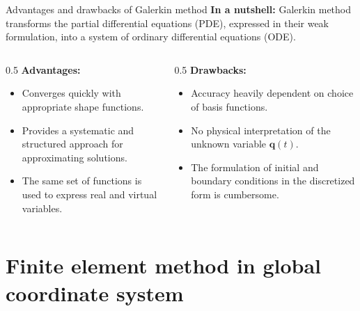 \documentclass[aspectratio=169]{beamer}
\begin{document}
\begin{frame}{Advantages and drawbacks of Galerkin method}
  \textbf{In a nutshell:} Galerkin method transforms the partial differential equations (PDE), expressed in their weak formulation, into a system of ordinary differential equations (ODE).
  \vspace{0.7cm}
  \begin{columns}
    \begin{column}{0.5\textwidth}
      \textbf{Advantages:}
      \begin{itemize}
        \item[\Checkmark]Converges quickly with appropriate shape functions.
        \item[\Checkmark]  Provides a systematic and structured approach for approximating solutions.
        \item[\Checkmark] The same set of functions is used to express real and virtual variables.
      \end{itemize}
    \end{column}

    \begin{column}{0.5\textwidth}
      \textbf{Drawbacks:}
      \begin{itemize}
        \item[\XSolidBrush] Accuracy heavily dependent on choice of basis functions.
        \item[\XSolidBrush]No physical interpretation of the unknown variable $\mathbf q(t)$.
        \item[\XSolidBrush] The formulation of initial and boundary conditions in the discretized form is cumbersome.
      \end{itemize}
    \end{column}
  \end{columns}
\end{frame}

\section{Finite element method in global coordinate system}
\end{document}
